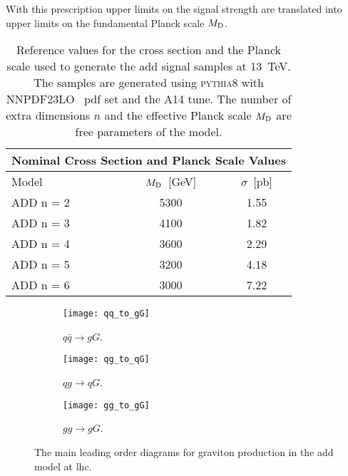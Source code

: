 With this prescription upper limits on the signal strength are translated into
upper limits on the fundamental Planck scale $M_\mathrm{D}$.
\begin{table}[!h]
  \centering
  \begin{tabular}{lcc}
    \toprule
    \multicolumn{3}{c}{Nominal Cross Section and Planck Scale Values} \\
    \midrule \midrule
    Model & $M_\mathrm{D}$~[GeV] & $\sigma$~[pb] \\
    \midrule
    ADD n = 2 & 5300 & 1.55 \\
    ADD n = 3 & 4100 & 1.82 \\
    ADD n = 4 & 3600 & 2.29 \\
    ADD n = 5 & 3200 & 4.18 \\
    ADD n = 6 & 3000 & 7.22 \\
    \bottomrule
  \end{tabular}
  \caption{Reference values for the cross section and the Planck scale used to
    generate the \gls{add} signal samples at 13~TeV. The samples are generated
    using \textsc{pythia8} with NNPDF23LO~\cite{NNPDF23LO} \gls{pdf} set and the
    A14 tune. The number of extra dimensions $n$ and the effective Planck scale
    $M_\mathrm{D}$ are free parameters of the model.}
  \label{tab:sigma_md_ref}
\end{table}
\begin{figure}[!h]
  \centering
  \begin{subfigure}{.3\linewidth}
    \texttt{[image: qq\_to\_gG]}
    \caption{$q \bar{q} \rightarrow g G$.}
  \end{subfigure}
  \begin{subfigure}{.3\linewidth}
    \texttt{[image: qg\_to\_qG]}
    \caption{$q g \rightarrow q G$.}
  \end{subfigure}
  \begin{subfigure}{.3\linewidth}
    \texttt{[image: gg\_to\_gG]}
    \caption{$g g \rightarrow g G$.}
  \end{subfigure}
  \caption{The main leading order diagrams for graviton production in the
    \gls{add} model at \gls{lhc}.}
  \label{fig:add_feynman}
\end{figure}
